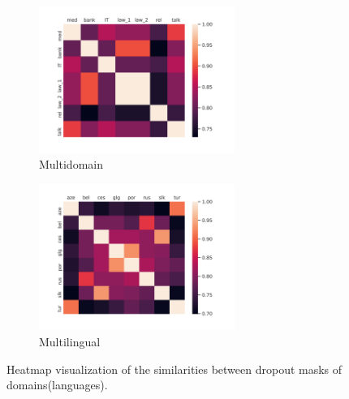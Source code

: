 \documentclass[11pt]{article}
\begin{document}
\begin{figure}[h!]
\begin{subfigure}{0.5\textwidth}
  \centering
  \includegraphics[width=0.7\textwidth]{multi_domain_heatmap.png}  
  \caption{Multidomain}
  \label{fig:md-heatmap}
\end{subfigure}
\begin{subfigure}{0.5\textwidth}
  \centering
  \includegraphics[width=0.7\textwidth]{multilingual_heatmap.png}  
  \caption{Multilingual}
  \label{fig:ml-heatmap}
\end{subfigure}
\caption{Heatmap visualization of the similarities between dropout masks of domains(languages).}
\label{fig:heatmap}
\end{figure}
\end{document}
